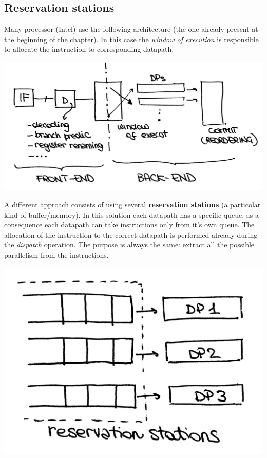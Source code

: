 \subsection{Reservation stations}
Many processor (Intel) use the following architecture (the one already present
at the beginning of the chapter). In this case the \textit{window of execution}
is responsible to allocate the instruction to corresponding datapath.
\begin{center}
  \includegraphics[width=0.7\linewidth]{img/img3/4}
\end{center}
A different approach consists of using several \textbf{reservation stations} (a
particolar kind of buffer/memory). In this solution each datapath has a
specific queue, as a consequence  each datapath can take instructions only from
it's own queue. The allocation of the instruction to the correct datapath is
performed already during the \textit{dispatch} operation.  The purpose is
always the same: extract all the possible parallelism from the instructions.
\begin{center}
  \includegraphics[width=0.5\linewidth]{img/img3/5}
\end{center}


